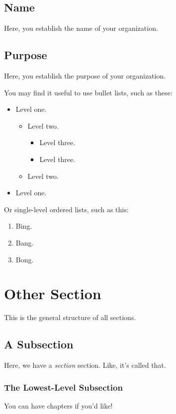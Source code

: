 \documentclass[12pt,letterpaper]{article}
\begin{document}
\subsection{Name}
Here, you establish the name of your organization.

\subsection{Purpose}
Here, you establish the purpose of your organization.

You may find it useful to use bullet lists, such as these:
\begin{itemize}
  \item Level one.
    \begin{itemize}
      \item Level two.
        \begin{itemize}
          \item Level three.
          \item Level three.
        \end{itemize}
      \item Level two.
    \end{itemize}
  \item Level one.
\end{itemize}

Or single-level ordered lists, such as this:

\begin{enumerate}
  \item Bing.
  \item Bang.
  \item Bong.
\end{enumerate}

\section{Other Section}
This is the general structure of all sections.

\subsection{A Subsection}
Here, we have a \textit{section} section. Like, it's called that.

\subsubsection{The Lowest-Level Subsection}
You can have chapters if you'd like!
\end{document}
